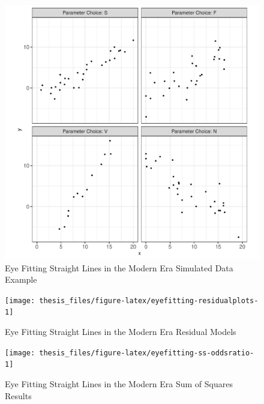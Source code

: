 \documentclass[print]{nuthesis}
\begin{document}
\begin{figure}[tbp]

{\centering \includegraphics[width=1\linewidth,]{thesis_files/figure-latex/eyefitting-simplot-1} 

}

\caption{Eye Fitting Straight Lines in the Modern Era Simulated Data Example}\label{fig:eyefitting-simplot}
\end{figure}

\begin{figure}[tbp]

{\centering \texttt{[image: thesis\_files/figure-latex/eyefitting-residualplots-1]} 

}

\caption{Eye Fitting Straight Lines in the Modern Era Residual Models}\label{fig:eyefitting-residualplots}
\end{figure}

\begin{figure}[tbp]

{\centering \texttt{[image: thesis\_files/figure-latex/eyefitting-ss-oddsratio-1]} 

}

\caption{Eye Fitting Straight Lines in the Modern Era Sum of Squares Results}\label{fig:eyefitting-ss-oddsratio}
\end{figure}
\end{document}
